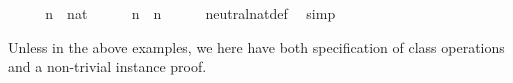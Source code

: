 \begin{isabellebody}
%
\isadelimproof
\ %
\endisadelimproof
%
\isatagproof
{}\isamarkupfalse%
\isanewline
\ \ \isamarkupfalse%
\ n\ {\isacharcolon}{\isacharcolon}\ nat\isanewline
\ \ \isamarkupfalse%
\ {\isachardoublequoteopen}{\isasymzero}\ {\isasymoplus}\ n\ {\isacharequal}\ n{\isachardoublequoteclose}\isanewline
\ \ \ \ \isamarkupfalse%
\ neutral{\isacharunderscore}nat{\isacharunderscore}def\ \isamarkupfalse%
\ simp\isanewline
{}\isamarkupfalse%
%
\endisatagproof
{\isafoldproof}%
%
\isadelimproof
%
\endisadelimproof
\isanewline
\isanewline
{}\isamarkupfalse%
%
\begin{isamarkuptext}%
\noindent Unless in the above examples, we here have both
specification of class operations and a non-trivial instance proof.


\end{isamarkuptext}
\end{isabellebody}
